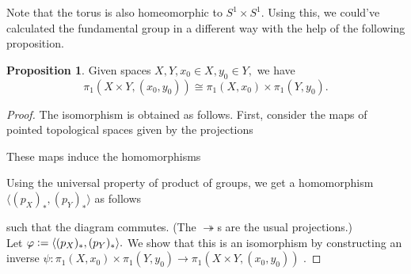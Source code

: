 \documentclass[12pt]{article}
\theoremstyle{definition}
\numberwithin{thm}{section}
\newtheorem{prop}[thm]{Proposition}
\begin{document}
Note that the torus is also homeomorphic to $S^1 \times S^1.$ Using this, we could've calculated the fundamental group in a different way with the help of the following proposition.
\begin{prop}
	Given spaces $X, Y, x_0 \in X, y_0 \in Y,$ we have
	\begin{equation*} 
		\pi_1(X \times Y, (x_0, y_0)) \cong \pi_1(X, x_0) \times \pi_1(Y, y_0).
	\end{equation*}
\end{prop}
\begin{proof} 
	The isomorphism is obtained as follows. First, consider the maps of pointed topological spaces given by the projections
	\begin{center}
	\end{center}
	These maps induce the homomorphisms
	\begin{center}
	\end{center}
	Using the universal property of product of groups, we get a homomorphism $\langle (p_X)_*, (p_Y)_*\rangle$ as follows
	\begin{center}
	\end{center}
	such that the diagram commutes. (The $\twoheadrightarrow$s are the usual projections.)\\
	Let $\varphi \vcentcolon= \langle (p_X)_*, (p_Y)_*\rangle.$ We show that this is an isomorphism by constructing an inverse $\psi:\pi_1(X, x_0) \times \pi_1(Y, y_0) \to \pi_1(X \times Y, (x_0, y_0))$ .


\end{proof}
\end{document}
